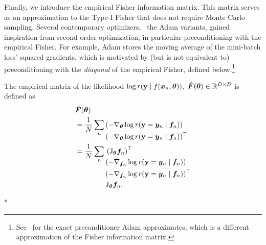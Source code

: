 Finally, we introduce the empirical Fisher information matrix.
This matrix serves as an approximation to the Type-I Fisher that does not require Monte Carlo sampling.
Several contemporary optimizers, \eg~the Adam variants, gained inspiration from second-order optimization, in particular preconditioning with the empirical Fisher.
For example, Adam stores the moving average of the mini-batch loss' squared gradients, which is motivated by (but is not equivalent to) preconditioning with the \emph{diagonal} of the empirical Fisher, defined below.\footnote{See~\cite{lin2024can} for the exact preconditioner Adam approximates, which is a different approximation of the Fisher information matrix.}

\begin{definition}\label{def:emp_fisher}%
  The empirical matrix of the likelihood $\log r({\mathbf{y}} \mid f({\bm{x}}_n, {\bm{\theta}}))$,
  $\hat{{\bm{F}}}({\bm{\theta}}) \in {\mathbb{R}}^{D \times D}$ is defined as
  \begin{align*}
    & \hat{{\bm{F}}}({\bm{\theta}}) \\
	& = \frac{1}{N} \sum_{n}
	\begin{aligned}[t]
	   & (-\nabla_{{\bm{\theta}}} \log r({\mathbf{y}} = {\bm{y}}_n \mid {\bm{f}}_n))        \\
	   & (-\nabla_{{\bm{\theta}}} \log r({\mathbf{y}} = {\bm{y}}_n \mid {\bm{f}}_n))^{\top} \\
	\end{aligned} \\
    & = \frac{1}{N} \sum_{n}
    \begin{aligned}[t]
       & \left(\mathrm{J}_{{\bm{\theta}}}{\bm{f}}_n\right)^{\top}                  \\
       & (-\nabla_{{\bm{f}}_n} \log r({\mathbf{y}} = {\bm{y}}_n \mid {\bm{f}}_n))        \\
       & (-\nabla_{{\bm{f}}_n} \log r({\mathbf{y}} = {\bm{y}}_n \mid {\bm{f}}_n))^{\top} \\
       & \mathrm{J}_{{\bm{\theta}}}{\bm{f}}_n.
    \end{aligned}
  \end{align*}
\end{definition}

\switchcolumn[1]*
\switchcolumn[0]


